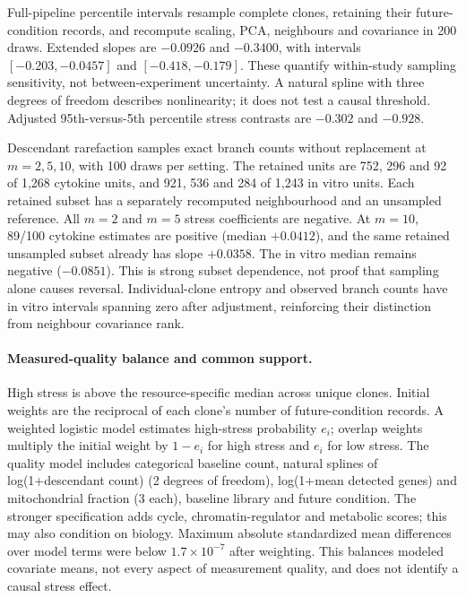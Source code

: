 \documentclass[a4paper,fleqn]{cas-sc}
\begin{document}
Full-pipeline percentile intervals resample complete clones, retaining their future-condition records, and recompute scaling, PCA, neighbours and covariance in 200 draws. Extended slopes are $-0.0926$ and $-0.3400$, with intervals $[-0.203,-0.0457]$ and $[-0.418,-0.179]$. These quantify within-study sampling sensitivity, not between-experiment uncertainty. A natural spline with three degrees of freedom describes nonlinearity; it does not test a causal threshold. Adjusted 95th-versus-5th percentile stress contrasts are $-0.302$ and $-0.928$.

Descendant rarefaction samples exact branch counts without replacement at $m=2,5,10$, with 100 draws per setting. The retained units are 752, 296 and 92 of 1,268 cytokine units, and 921, 536 and 284 of 1,243 in vitro units. Each retained subset has a separately recomputed neighbourhood and an unsampled reference. All $m=2$ and $m=5$ stress coefficients are negative. At $m=10$, 89/100 cytokine estimates are positive (median $+0.0412$), and the same retained unsampled subset already has slope $+0.0358$. The in vitro median remains negative ($-0.0851$). This is strong subset dependence, not proof that sampling alone causes reversal. Individual-clone entropy and observed branch counts have in vitro intervals spanning zero after adjustment, reinforcing their distinction from neighbour covariance rank.

\paragraph{Measured-quality balance and common support.}
High stress is above the resource-specific median across unique clones. Initial weights are the reciprocal of each clone's number of future-condition records. A weighted logistic model estimates high-stress probability $e_i$; overlap weights multiply the initial weight by $1-e_i$ for high stress and $e_i$ for low stress. The quality model includes categorical baseline count, natural splines of log(1+descendant count) (2 degrees of freedom), log(1+mean detected genes) and mitochondrial fraction (3 each), baseline library and future condition. The stronger specification adds cycle, chromatin-regulator and metabolic scores; this may also condition on biology. Maximum absolute standardized mean differences over model terms were below $1.7\times10^{-7}$ after weighting. This balances modeled covariate means, not every aspect of measurement quality, and does not identify a causal stress effect.
\end{document}
